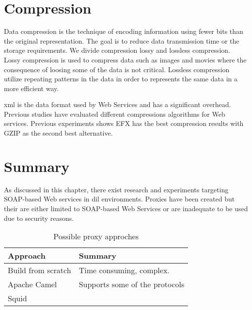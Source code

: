

\section{Compression}

Data compression is the technique of encoding information using fewer bits than
the original representation. The goal is to reduce data transmission time or the
storage requirements. We divide compression lossy and lossless compression.
Lossy compression is used to compress data such as images and movies where the
consequence of loosing some of the data is not critical. Lossless compression
utilize repeating patterns in the  data in order to represents the same data in
a more efficient way.

\gls{xml} is the data format used by Web Services and has a significant
overhead. Previous studies have evaluated different compressions algorithms for
Web services. Previous experiments shows EFX has the best compression results with
GZIP as the second best alternative\cite{johnsen-trude-compression-techniqes}.


\section{Summary}

As discussed in this chapter, there exist research and experiments targeting
SOAP-based Web services in \gls{dil} environments. Proxies have been created but
their are either limited to SOAP-based Web Services or are inadequate to be used
due to security reasons.

\begin{table}
    \begin{tabular}{|l|l|}
    \hline
    \textbf{Approach}          & \textbf{Summary}     \\ \hline
    Build from scratch & Time consuming, complex.       \\ \hline
    Apache Camel      & Supports some of the protocols \\ \hline
    Squid      & \\ \hline
    \end{tabular}
    \caption {Possible proxy approches}
\end{table}
